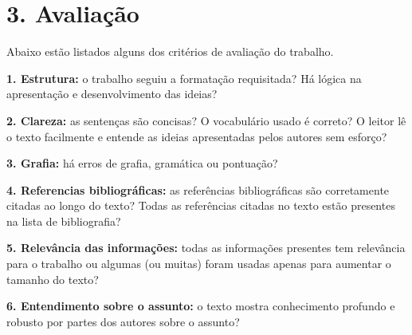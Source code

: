 \documentclass[a4paper,10pt]{article}
\begin{document}
   \section* {3. Avaliação}

    Abaixo estão listados alguns dos critérios de avaliação do trabalho.

    \textbf{1. Estrutura:} o trabalho seguiu a formatação requisitada? Há lógica na apresentação e desenvolvimento das ideias?

    \textbf{2. Clareza:} as sentenças são concisas? O vocabulário usado é correto? O leitor lê o texto facilmente e entende as ideias apresentadas pelos autores sem esforço?

    \textbf{3. Grafia:} há erros de grafia, gramática ou pontuação?

    \textbf{4. Referencias bibliográficas:} as referências bibliográficas são corretamente citadas ao longo do texto? Todas as referências citadas no texto estão presentes na lista de bibliografia?

    \textbf{5. Relevância das informações:} todas as informações presentes tem relevância para o trabalho ou algumas (ou muitas) foram usadas apenas para aumentar o tamanho do texto?

   \textbf{6. Entendimento sobre o assunto:} o texto mostra conhecimento profundo e robusto por partes dos autores sobre o assunto?

  \clearpage %
\end{document}
